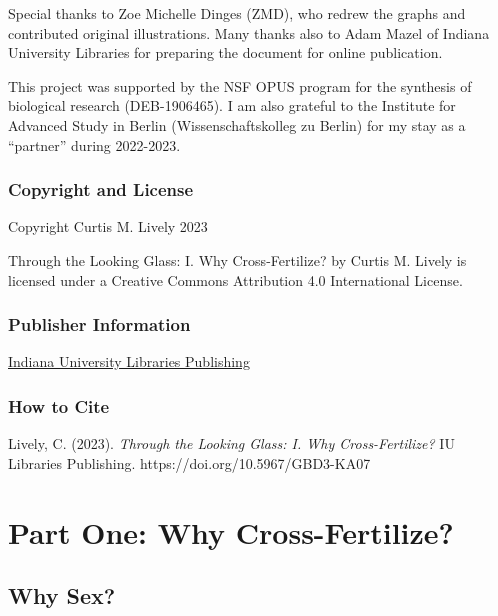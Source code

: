 \documentclass[
  letterpaper,
]{book}
\begin{document}
Special thanks to Zoe Michelle Dinges (ZMD), who redrew the graphs and
contributed original illustrations. Many thanks also to Adam Mazel of
Indiana University Libraries for preparing the document for online
publication.

This project was supported by the NSF OPUS program for the synthesis of
biological research (DEB-1906465). I am also grateful to the Institute
for Advanced Study in Berlin (Wissenschaftskolleg zu Berlin) for my stay
as a ``partner'' during 2022-2023.

\hypertarget{copyright-and-license}{%
\section*{Copyright and License}\label{copyright-and-license}}


Copyright Curtis M. Lively 2023

{Through the Looking Glass: I. Why Cross-Fertilize?} by Curtis M. Lively
is licensed under a Creative Commons Attribution 4.0 International
License.

\hypertarget{publisher-information}{%
\section*{Publisher Information}\label{publisher-information}}


\href{https://libraries.indiana.edu/}{Indiana University Libraries
Publishing}

\hypertarget{how-to-cite}{%
\section*{How to Cite}\label{how-to-cite}}


Lively, C. (2023). \emph{Through the Looking Glass: I. Why
Cross-Fertilize?} IU Libraries Publishing.
https://doi.org/10.5967/GBD3-KA07

\part{Part One: Why Cross-Fertilize?}

\hypertarget{sec-why-sex}{%
\chapter{Why Sex?}\label{sec-why-sex}}
\end{document}
